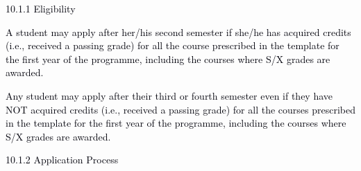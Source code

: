 \documentclass[12pt]{article}
\begin{document}
\vspace{\baselineskip}
{\fontsize{10pt}{12.0pt}\selectfont \textcolor[HTML]{00000A}{10.1.1 Eligibility}\par}\par


\vspace{\baselineskip}
\begin{adjustwidth}{0.25in}{0.0in}
\begin{justify}
{\fontsize{10pt}{12.0pt}\selectfont \textcolor[HTML]{00000A}{A student may apply after her/his second semester if she/he has acquired credits (i.e., received a passing grade) for all the course prescribed in the template for the first year of the programme, including the courses where S/X grades are awarded.}\par}
\end{justify}\par

\end{adjustwidth}


\vspace{\baselineskip}
\begin{adjustwidth}{0.25in}{0.0in}
\begin{justify}
{\fontsize{10pt}{12.0pt}\selectfont \textcolor[HTML]{00000A}{Any student may apply after their third or fourth semester even if they have NOT acquired credits (i.e., received a passing grade) for all the courses prescribed in the template for the first year of the programme, including the courses where S/X grades are awarded.}\par}
\end{justify}\par

\end{adjustwidth}


\vspace{\baselineskip}

\vspace{\baselineskip}
{\fontsize{10pt}{12.0pt}\selectfont \textcolor[HTML]{00000A}{10.1.2 Application Process}\par}\par
\end{document}
